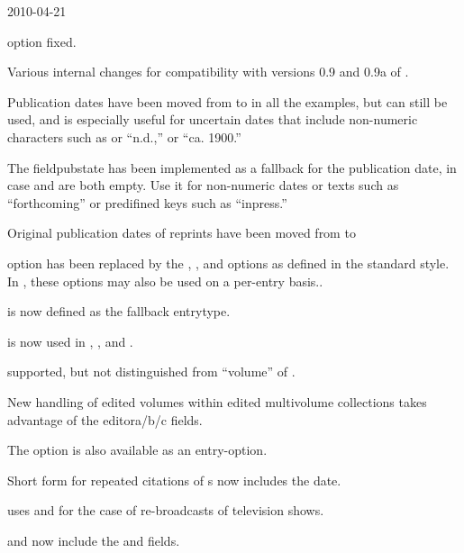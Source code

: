 \documentclass{ltxdockit}[2010/02/12]
\begin{document}
{\begin{changelog}
\begin{release}{0.3}{2010-04-21}
\item {} option fixed.
\item Various internal changes for compatibility with versions 0.9 and 0.9a of .
\item Publication dates have been moved from  to  in all the examples, but  can still be used, and is especially useful for uncertain dates that include non-numeric characters such as or ``n.d.,'' or ``ca. 1900.''
\item The field{pubstate} has been implemented as a fallback for the publication date, in case  and  are both empty. Use it for non-numeric dates or texts such as ``forthcoming'' or predifined keys such as ``inpress.''
\item Original publication dates of reprints have been moved from  to 
\item {} option has been replaced by the , , and  options as defined in the standard style. In , these options may also be used on a per-entry basis..
\item {} is now defined as the fallback entrytype.
\item {} is now used in , , and .
\item {} supported, but not distinguished from  ``volume'' of .
\item New handling of edited volumes within edited multivolume collections takes advantage of the editora/b/c fields.
\item The  option is also available as an entry-option. 
\item Short form for repeated citations of s now includes the date.
\item {} uses  and  for the case of re-broadcasts of television shows.
\item {} and  now include the  and  fields. 
\end{release}


\end{changelog}}
\end{document}
